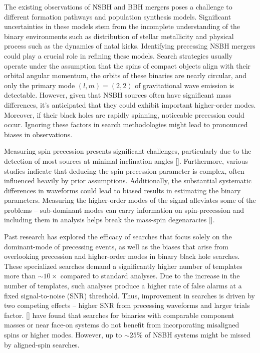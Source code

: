 The existing observations of NSBH and BBH mergers poses a challenge to different formation pathways and population synthesis models. Significant uncertainties in these models stem from the incomplete understanding of the binary environments such as distribution of stellar metallicity and physical process such as the dynamics of natal kicks. Identifying precessing NSBH mergers could play a crucial role in refining these models. Search strategies usually operate under the assumption that the spins of compact objects align with their orbital angular momentum, the orbits of these binaries are nearly circular, and only the primary mode $(l, m) = (2, 2)$ of gravitational wave emission is detectable. However, given that NSBH sources often have significant mass differences, it's anticipated that they could exhibit important higher-order modes. Moreover, if their black holes are rapidly spinning, noticeable precession could occur. Ignoring these factors in search methodologies might lead to pronounced biases in observations.  

Measuring spin precession presents significant challenges, particularly due to the detection of most sources at minimal inclination angles []. Furthermore, various studies indicate that deducing the spin precession parameter is complex, often influenced heavily by prior assumptions. Additionally, the substantial systematic differences in waveforms could lead to biased results in estimating the binary parameters. Measuring the higher-order modes of the signal alleviates some of the problems -- sub-dominant modes can carry information on spin-precession and including them in analysis helps break the mass-spin degenaracies [].

Past research has explored the efficacy of searches that focus solely on the dominant-mode of precessing events, as well as the biases that arise from overlooking precession and higher-order modes in binary black hole searches. These specialized searches demand a significantly higher number of templates more than $\sim 10\times$ compared to standard analyses. Due to the increase in the number of templates, such analyses produce a higher rate of false alarms at a fixed signal-to-noise (SNR) threshold. Thus, improvement in searches is driven by two competing effects -- higher SNR from precessing waveforms and larger trials factor. [] have found that searches for binaries with comparable component masses or near face-on systems do not benefit from incorporating misaligned spins or higher modes. However, up to $\sim 25\%$ of NSBH systems might be missed by aligned-spin searches. 

